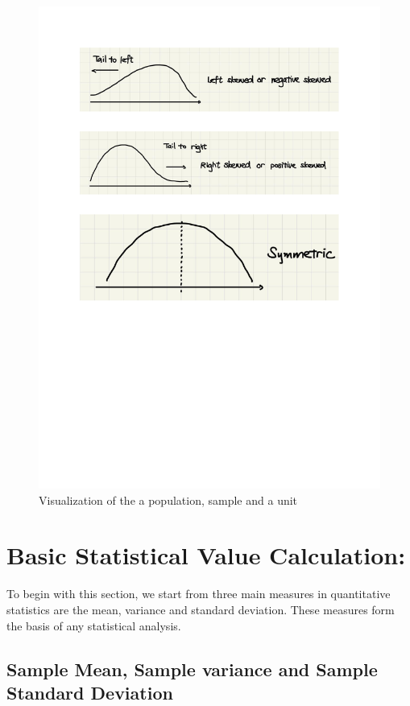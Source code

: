 \begin{figure}[H]
	\centering
	\includegraphics[scale=1.25]{Section1/img/SkewnessAll.pdf}
	\caption{Visualization of the a population, sample and a unit}
\end{figure}

\section{Basic Statistical Value Calculation:}

To begin with this section, we start from three main measures in quantitative statistics are the mean, variance and standard deviation. These measures form the basis of any statistical analysis.\\

\subsection{Sample Mean, Sample variance and Sample Standard Deviation}

